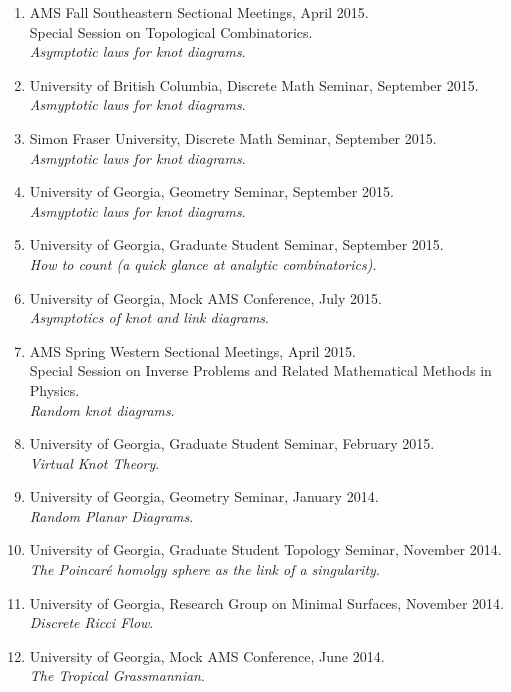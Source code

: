 \documentclass[letterpaper]{article}
\begin{document}
\begin{enumerate}
\item AMS Fall Southeastern Sectional Meetings, April 2015.\\
  Special Session on Topological Combinatorics. \\
  \textit{Asymptotic laws for knot diagrams}.
\item University of British Columbia, Discrete Math Seminar, September 2015.\\
  \textit{Asmyptotic laws for knot diagrams}.
\item Simon Fraser University, Discrete Math Seminar, September 2015.\\
  \textit{Asmyptotic laws for knot diagrams}.
\item University of Georgia, Geometry Seminar, September 2015.\\
  \textit{Asmyptotic laws for knot diagrams}.
\item University of Georgia, Graduate Student Seminar, September 2015.\\
  \textit{How to count (a quick glance at analytic combinatorics)}.
\item University of Georgia, Mock AMS Conference, July 2015.\\
  \textit{Asymptotics of knot and link diagrams}.
\item AMS Spring Western Sectional Meetings, April 2015.\\
  Special Session on Inverse Problems and Related Mathematical Methods in Physics. \\
  \textit{Random knot diagrams}.
\item University of Georgia, Graduate Student Seminar, February
  2015.\\
  \textit{Virtual Knot Theory}.
\item University of Georgia, Geometry Seminar, January 2014.\\
  \textit{Random Planar Diagrams}.
\item University of Georgia, Graduate Student Topology Seminar,
  November 2014.\\
  \textit{The Poincar\'e homolgy sphere as the link of a singularity}.
\item University of Georgia, Research Group on
  Minimal Surfaces, November 2014.\\
  \textit{Discrete Ricci Flow}.
\item University of Georgia, Mock AMS Conference, June 2014.\\
  \textit{The Tropical Grassmannian}.

\end{enumerate}
\end{document}
